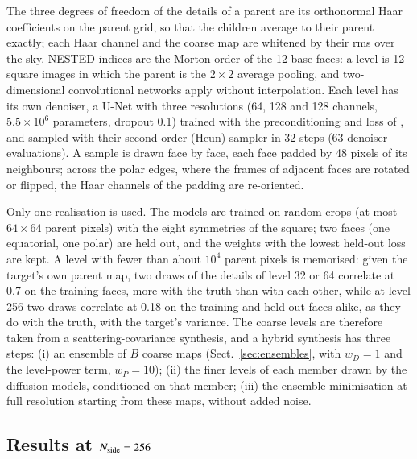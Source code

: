 \documentclass{aa}
\newcommand{\nside}{N_{\rm side}}
\begin{document}
The three degrees of freedom of the details of a parent are its orthonormal Haar coefficients on the parent grid, so that the children average to their parent exactly; each Haar channel and the coarse map are whitened by their rms over the sky. NESTED indices are the Morton order of the 12 base faces: a level is 12 square images in which the parent is the $2\times2$ average pooling, and two-dimensional convolutional networks apply without interpolation. Each level has its own denoiser, a U-Net \citep{ronneberger2015} with three resolutions (64, 128 and 128 channels, $5.5\times10^6$ parameters, dropout 0.1) trained with the preconditioning and loss of \citet{karras2022}, and sampled with their second-order (Heun) sampler in 32 steps (63 denoiser evaluations). A sample is drawn face by face, each face padded by 48 pixels of its neighbours; across the polar edges, where the frames of adjacent faces are rotated or flipped, the Haar channels of the padding are re-oriented.

Only one realisation is used. The models are trained on random crops (at most $64\times64$ parent pixels) with the eight symmetries of the square; two faces (one equatorial, one polar) are held out, and the weights with the lowest held-out loss are kept. A level with fewer than about $10^4$ parent pixels is memorised: given the target's own parent map, two draws of the details of level 32 or 64 correlate at 0.7 on the training faces, more with the truth than with each other, while at level 256 two draws correlate at 0.18 on the training and held-out faces alike, as they do with the truth, with the target's variance. The coarse levels are therefore taken from a scattering-covariance synthesis, and a hybrid synthesis has three steps: (i) an ensemble of $B$ coarse maps (Sect.~\ref{sec:ensembles}, with $w_D=1$ and the level-power term, $w_P=10$); (ii) the finer levels of each member drawn by the diffusion models, conditioned on that member; (iii) the ensemble minimisation at full resolution starting from these maps, without added noise.

\subsection{Results at $\nside=256$}
\end{document}
